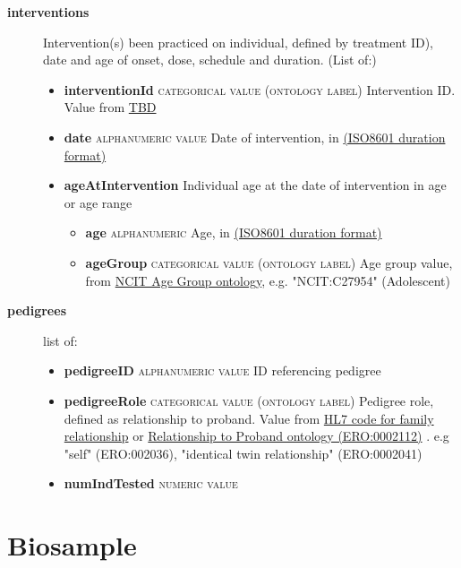 \documentclass[a4paper, 10pt]{article}        %
\begin{document}
\begin{description}
	\item[\textbf{interventions}] Intervention(s) been practiced on individual, defined by treatment ID), date and age of onset, dose, schedule and duration. (List of:)
	\begin{itemize}
			\item[] \textbf{interventionId} {\textsc{categorical value (ontology label)}} Intervention ID. Value from \href{link}{TBD}
			\item[] \textbf{date} {\textsc{alphanumeric value}} Date of intervention, in \href{link}{(ISO8601 duration format)}			\item[] \textbf{ageAtIntervention} Individual age at the date of intervention in age or age range
			\begin{itemize}
			\item[] \textbf{age} {\textsc{alphanumeric}} Age, in \href{link}{(ISO8601 duration format)}  
			\item[] \textbf{ageGroup} {\textsc{categorical value (ontology label)}} Age group value, from \href{link}{NCIT Age Group ontology}, e.g. "NCIT:C27954" (Adolescent)
			\end{itemize}
	\end{itemize} 

	\item[\textbf{pedigrees}] list of:
	\begin{itemize}
			\item[] \textbf{pedigreeID} {\textsc{alphanumeric value}}  ID referencing pedigree
			\item[] \textbf{pedigreeRole} {\textsc{categorical value (ontology label)}} Pedigree role, defined as relationship to proband. Value from \href{link}{HL7 code for family relationship} or \href{link}{Relationship to Proband ontology (ERO:0002112)} . e.g "self" (ERO:002036), "identical twin relationship" (ERO:0002041)
			\item[] \textbf{numIndTested} {\textsc{numeric value}}
	\end{itemize}


 \end{description}

  
  \section*{ {\color{teal} Biosample}}
  
\end{document}
